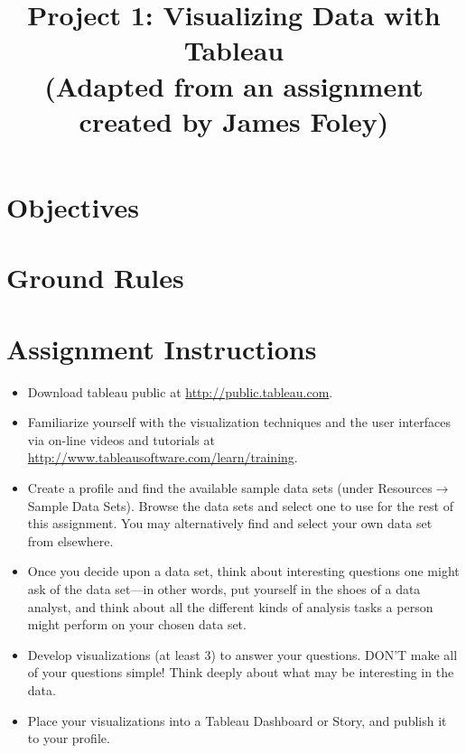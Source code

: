 \documentclass[a4paper,12pt]{article}
\title{Project 1: Visualizing Data with Tableau \\
\vspace{5pt}\normalsize (Adapted from an assignment created by James Foley)}
\begin{document}
\maketitle


\section{Objectives}


\vspace{5pt}
\section{Ground Rules}



\vspace{5pt}
\section{Assignment Instructions}

\begin{itemize}

\item Download tableau public at  \url{http://public.tableau.com}.

\item Familiarize yourself with the visualization techniques and the user interfaces via on-line videos  and tutorials at \url{http://www.tableausoftware.com/learn/training}.

\item Create a profile and find the available sample data sets (under Resources$\rightarrow$Sample Data Sets). Browse the data sets and select one to use for the rest of this assignment. You may alternatively find and select your own data set from elsewhere.
\item Once you decide upon a data set, think about interesting questions one might ask of the data set---in other words, put yourself in the shoes of a data analyst, and think about all the different kinds of analysis tasks a person might perform on your chosen data set. 
\item Develop visualizations (at least 3) to answer your questions. DON'T make all of your questions simple! Think deeply about what may be interesting in the data.
\item Place your visualizations into a Tableau Dashboard or Story, and publish it to your profile. 

\end{itemize}
\end{document}
